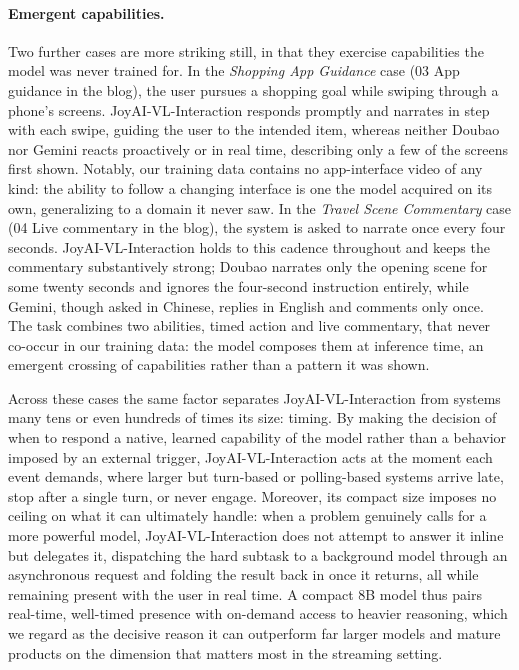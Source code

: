 \paragraph{\textbf{Emergent capabilities.}}
Two further cases are more striking still, in that they exercise capabilities the model was never trained for. In the \textit{Shopping App Guidance} case (03 App guidance in the blog), the user pursues a shopping goal while swiping through a phone's screens. JoyAI-VL-Interaction responds promptly and narrates in step with each swipe, guiding the user to the intended item, whereas neither Doubao nor Gemini reacts proactively or in real time, describing only a few of the screens first shown. Notably, our training data contains no app-interface video of any kind: the ability to follow a changing interface is one the model acquired on its own, generalizing to a domain it never saw.
In the \textit{Travel Scene Commentary} case (04 Live commentary in the blog), the system is asked to narrate once every four seconds. JoyAI-VL-Interaction holds to this cadence throughout and keeps the commentary substantively strong; Doubao narrates only the opening scene for some twenty seconds and ignores the four-second instruction entirely, while Gemini, though asked in Chinese, replies in English and comments only once. The task combines two abilities, timed action and live commentary, that never co-occur in our training data: the model composes them at inference time, an emergent crossing of capabilities rather than a pattern it was shown.

Across these cases the same factor separates JoyAI-VL-Interaction from systems many tens or even hundreds of times its size: timing. By making the decision of when to respond a native, learned capability of the model rather than a behavior imposed by an external trigger, JoyAI-VL-Interaction acts at the moment each event demands, where larger but turn-based or polling-based systems arrive late, stop after a single turn, or never engage. Moreover, its compact size imposes no ceiling on what it can ultimately handle: when a problem genuinely calls for a more powerful model, JoyAI-VL-Interaction does not attempt to answer it inline but delegates it, dispatching the hard subtask to a background model through an asynchronous request and folding the result back in once it returns, all while remaining present with the user in real time. A compact 8B model thus pairs real-time, well-timed presence with on-demand access to heavier reasoning, which we regard as the decisive reason it can outperform far larger models and mature products on the dimension that matters most in the streaming setting.


